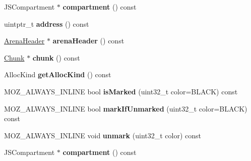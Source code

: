 \begin{DoxyCompactItemize}
\item 
\hypertarget{structjs_1_1gc_1_1_cell_a3a4e1a0abbca8989e6c3f3599613f98a}{J\-S\-Compartment $\ast$ {\bfseries compartment} () const }\label{structjs_1_1gc_1_1_cell_a3a4e1a0abbca8989e6c3f3599613f98a}

\item 
\hypertarget{structjs_1_1gc_1_1_cell_ae8c0e74e2cec647b280ebef5bb3fd9ec}{uintptr\-\_\-t {\bfseries address} () const }\label{structjs_1_1gc_1_1_cell_ae8c0e74e2cec647b280ebef5bb3fd9ec}

\item 
\hypertarget{structjs_1_1gc_1_1_cell_acd4ddf1c2e6d75896e18d79ac3f123d0}{\hyperlink{structjs_1_1gc_1_1_arena_header}{Arena\-Header} $\ast$ {\bfseries arena\-Header} () const }\label{structjs_1_1gc_1_1_cell_acd4ddf1c2e6d75896e18d79ac3f123d0}

\item 
\hypertarget{structjs_1_1gc_1_1_cell_a3afeeebcc69812044ed9445ab681bbea}{\hyperlink{structjs_1_1gc_1_1_chunk}{Chunk} $\ast$ {\bfseries chunk} () const }\label{structjs_1_1gc_1_1_cell_a3afeeebcc69812044ed9445ab681bbea}

\item 
\hypertarget{structjs_1_1gc_1_1_cell_a6cb5ec84ff5f9620ee3d362c00fe1cd5}{Alloc\-Kind {\bfseries get\-Alloc\-Kind} () const }\label{structjs_1_1gc_1_1_cell_a6cb5ec84ff5f9620ee3d362c00fe1cd5}

\item 
\hypertarget{structjs_1_1gc_1_1_cell_a7137356a58789dd00a66f08b5842881e}{M\-O\-Z\-\_\-\-A\-L\-W\-A\-Y\-S\-\_\-\-I\-N\-L\-I\-N\-E bool {\bfseries is\-Marked} (uint32\-\_\-t color=B\-L\-A\-C\-K) const }\label{structjs_1_1gc_1_1_cell_a7137356a58789dd00a66f08b5842881e}

\item 
\hypertarget{structjs_1_1gc_1_1_cell_a5e13936e9c9eabf3fbff93f69a862a0d}{M\-O\-Z\-\_\-\-A\-L\-W\-A\-Y\-S\-\_\-\-I\-N\-L\-I\-N\-E bool {\bfseries mark\-If\-Unmarked} (uint32\-\_\-t color=B\-L\-A\-C\-K) const }\label{structjs_1_1gc_1_1_cell_a5e13936e9c9eabf3fbff93f69a862a0d}

\item 
\hypertarget{structjs_1_1gc_1_1_cell_a9bcecdda3a0c768abfe6c68077bf6751}{M\-O\-Z\-\_\-\-A\-L\-W\-A\-Y\-S\-\_\-\-I\-N\-L\-I\-N\-E void {\bfseries unmark} (uint32\-\_\-t color) const }\label{structjs_1_1gc_1_1_cell_a9bcecdda3a0c768abfe6c68077bf6751}

\item 
\hypertarget{structjs_1_1gc_1_1_cell_ab4cbfaf3eacd6909084e3d0de3402682}{J\-S\-Compartment $\ast$ {\bfseries compartment} () const }\label{structjs_1_1gc_1_1_cell_ab4cbfaf3eacd6909084e3d0de3402682}

\end{DoxyCompactItemize}
